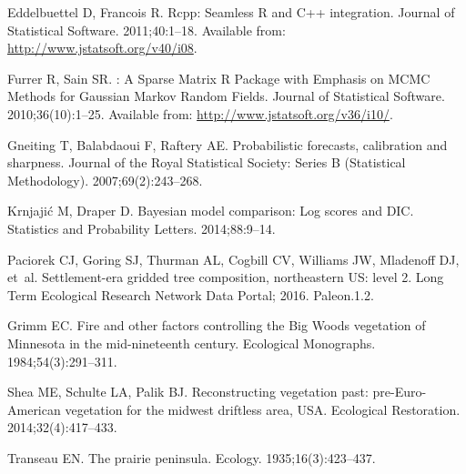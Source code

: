 \documentclass[10pt,letterpaper]{article}
\begin{document}
\begin{thebibliography}{10}
Eddelbuettel D, Francois R.
\newblock Rcpp: {S}eamless {R} and {C}++ integration.
\newblock Journal of Statistical Software. 2011;40:1--18.
\newblock Available from: \url{http://www.jstatsoft.org/v40/i08}.

Furrer R, Sain SR.
: A Sparse Matrix {R} Package with Emphasis on {MCMC} Methods
  for {G}aussian {M}arkov Random Fields.
\newblock Journal of Statistical Software. 2010;36(10):1--25.
\newblock Available from: \url{http://www.jstatsoft.org/v36/i10/}.

Gneiting T, Balabdaoui F, Raftery AE.
\newblock Probabilistic forecasts, calibration and sharpness.
\newblock Journal of the Royal Statistical Society: Series B (Statistical
  Methodology). 2007;69(2):243--268.

Krnjaji\'{c} M, Draper D.
\newblock Bayesian model comparison: {L}og scores and {DIC}.
\newblock Statistics and Probability Letters. 2014;88:9--14.

Paciorek CJ, Goring SJ, Thurman AL, Cogbill CV, Williams JW, Mladenoff DJ,
  et~al.
\newblock Settlement-era gridded tree composition, northeastern {US}: level 2.
\newblock Long Term Ecological Research Network Data Portal; 2016. Paleon.1.2.

Grimm EC.
\newblock Fire and other factors controlling the {B}ig {W}oods vegetation of
  {M}innesota in the mid-nineteenth century.
\newblock Ecological Monographs. 1984;54(3):291--311.

Shea ME, Schulte LA, Palik BJ.
\newblock Reconstructing vegetation past: pre-{E}uro-{A}merican vegetation for
  the midwest driftless area, {USA}.
\newblock Ecological Restoration. 2014;32(4):417--433.

Transeau EN.
\newblock The prairie peninsula.
\newblock Ecology. 1935;16(3):423--437.

\end{thebibliography}
\end{document}
